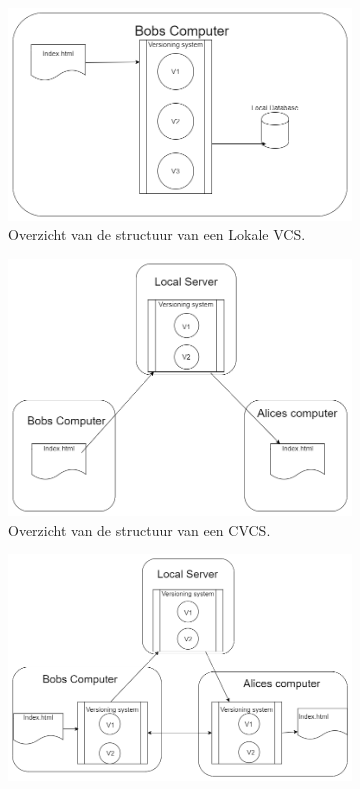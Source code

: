 \begin{figure}[h!]
	\centering
	\begin{subfigure}[b]{.5\textwidth}
	\centering
		\includegraphics[scale=.3]{LVCS.png}
		\caption[Overzicht structuur Lokale VCS]{Overzicht van de structuur van een Lokale VCS.}
	\end{subfigure}%
	\begin{subfigure}[b]{.5\textwidth}
	\centering
		\includegraphics[scale=.3]{CVCS.png}
			\caption[Overzicht structuur CVCS]{Overzicht van de structuur van een CVCS.}
	\end{subfigure}%
	\hfill
	\begin{subfigure}{.5\textwidth}
		\centering
		\includegraphics[scale=0.3]{DVCS.png}

\end{subfigure}
\end{figure}
